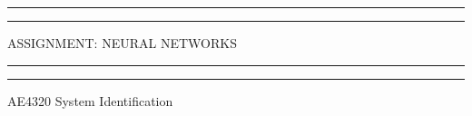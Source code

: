 \newcommand{\e}[2]{#1\cdot 10^{#2}}
\newcommand{\nd}[1]{\mathbf{#1}}


 
    \begin{titlepage} %

        \centering %
        
        \scshape %
        
        \vspace*{\baselineskip} %
        
        
        \rule{\textwidth}{1.6pt}\vspace*{-\baselineskip}\vspace*{2pt} %
        \rule{\textwidth}{0.4pt} %
        
        \vspace{0.75\baselineskip} %
        
        {\LARGE ASSIGNMENT: NEURAL NETWORKS} %
        
        \vspace{0.75\baselineskip} %
        
        \rule{\textwidth}{0.4pt}\vspace*{-\baselineskip}\vspace{3.2pt} %
        \rule{\textwidth}{1.6pt} %
        
        \vspace{2\baselineskip} %
        
        
        AE4320 System Identification
        
        \vspace*{3\baselineskip} %
        

\end{titlepage}
